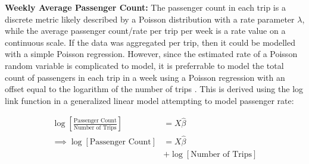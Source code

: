\documentclass[11pt]{article}
\begin{document}
\begin{multicols}{2}
    \textbf{Weekly Average Passenger Count:}
The passenger count in each trip is a discrete metric
likely described by a Poisson distribution with a rate parameter $\lambda$, 
while the average passenger count/rate per trip per week is a rate value on a continuous scale.
If the data was aggregated per trip, then it could be modelled with a simple Poisson regression.
However, since the estimated rate of a Poisson random variable is complicated to model,
it is preferrable to model the total count of passengers in each trip in a week
using a Poisson regression with an offset equal to the logarithm of the number of trips \cite{poisson}.
This is derived using the log link function in a generalized linear model attempting to model passenger rate:

\begin{align*}
    \log \left[\frac{\text{Passenger Count}}{\text{Number of Trips}}\right] &= X\hat{\beta} \\
    \implies \log \left[\text{Passenger Count}\right] &= X\hat{\beta} \\
    &+ \log \left[\text{Number of Trips}\right]
\end{align*}

\end{multicols}
\end{document}
